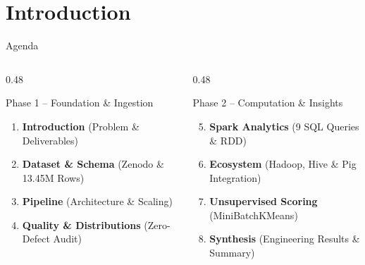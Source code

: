 \documentclass[aspectratio=169]{beamer}
\begin{document}
\section{Introduction}
\begin{frame}{Agenda}
  \vspace{0.15cm}
  \begin{columns}[T]
    \begin{column}{0.48\textwidth}
      \begin{block}{Phase 1 -- Foundation \& Ingestion}
        \footnotesize
        \begin{enumerate}
          \item \textbf{Introduction} (Problem \& Deliverables)
          \item \textbf{Dataset \& Schema} (Zenodo \& 13.45M Rows)
          \item \textbf{Pipeline} (Architecture \& Scaling)
          \item \textbf{Quality \& Distributions} (Zero-Defect Audit)
        \end{enumerate}
      \end{block}
    \end{column}
    \begin{column}{0.48\textwidth}
      \begin{block}{Phase 2 -- Computation \& Insights}
        \footnotesize
        \begin{enumerate}
          \setcounter{enumi}{4}
          \item \textbf{Spark Analytics} (9 SQL Queries \& RDD)
          \item \textbf{Ecosystem} (Hadoop, Hive \& Pig Integration)
          \item \textbf{Unsupervised Scoring} (MiniBatchKMeans)
          \item \textbf{Synthesis} (Engineering Results \& Summary)
        \end{enumerate}
      \end{block}
    \end{column}
  \end{columns}
\end{frame}
\end{document}
